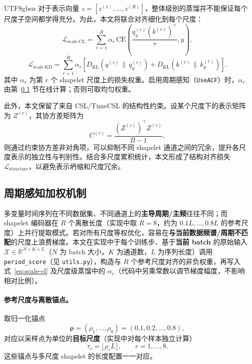 \documentclass{article}
\begin{document}
\begin{CJK*}{UTF8}{gbsn}
对于表示向量 $z=[z^{(1)},\dots,z^{(R)}]$，整体级别的蒸馏并不能保证每个尺度子空间都学得充分。为此，本文将联合对齐细化到每个尺度：
\begin{equation}
\mathcal{L}_{\text{scale-CL}} = \sum_{r=1}^{R}\alpha_r \,
\mathrm{CE}\left(\frac{q_g^{(r)}(k^{(r)})^\top}{\tau}, y\right),
\label{eq:scale-cl}
\end{equation}
\begin{equation}
\mathcal{L}_{\text{scale-KD}} = \sum_{r=1}^{R}\alpha_r \left[
D_{\mathrm{KL}}\left(q^{(r)} \,\|\, q_g^{(r)}\right)+
D_{\mathrm{KL}}\left(k^{(r)} \,\|\, k_g^{(r)}\right)\right].
\end{equation}
其中 $\alpha_r$ 为第 $r$ 个 shapelet 尺度上的损失权重。启用周期感知（\texttt{UseACF}）时，$\alpha_r$ 由第~\ref{sec:period-score} 节在线计算；否则可取均匀权重。

此外，本文保留了来自 CSL/TimeCSL 的结构性约束。设某个尺度下的表示矩阵为 $Z^{(r)}$，其协方差矩阵为
\begin{equation}
C^{(r)} = \frac{\left(Z^{(r)}\right)^\top Z^{(r)}}{B-1},
\end{equation}
则通过约束协方差非对角项，可以抑制不同 shapelet 通道之间的冗余，提升各尺度表示的独立性与判别性。结合多尺度累积统计，本文形成了结构对齐损失 $\mathcal{L}_{\text{structure}}$，以避免表示坍缩和尺度冗余。

\subsection{周期感知加权机制}
\label{sec:period-score}

多变量时间序列在不同数据集、不同通道上的\textbf{主导周期/主频}往往不同；而 shapelet 编码器在 $R$ 个离散长度（实现中取 $R{=}8$，约为 $0.1L,\ldots,0.8L$ 的参考尺度）上并行提取模式。若对所有尺度等权优化，容易在\textbf{与当前数据频谱/周期不匹配}的尺度上浪费梯度。本文在实现中于每个训练步、基于\textbf{当前 batch} 的原始输入 $\mathcal{X}\in\mathbb{R}^{N\times K\times L}$（$N$ 为 batch 大小，$K$ 为通道数，$L$ 为序列长度）调用 \texttt{period\_score}（见 \texttt{utils.py}），构造与 $R$ 个参考尺度对齐的非负权重，再写入式~\eqref{eq:scale-cl} 及尺度级蒸馏中的 $\alpha_r$（代码中另乘常数以调节梯度幅度，不影响相对比例）。

\paragraph{参考尺度与离散锚点。}
取归一化锚点
\begin{equation}
\bm{\rho}=(\rho_1,\ldots,\rho_8)=(0.1,0.2,\ldots,0.8),
\end{equation}
对应以采样点为单位的\textbf{目标尺度}（实现中对每个样本独立计算）
\begin{equation}
\tau_r=\bigl\lfloor \rho_r L \bigr\rfloor,\qquad r=1,\ldots,8.
\end{equation}
这些锚点与多尺度 shapelet 的长度配置一一对应。


\end{CJK*}
\end{document}
